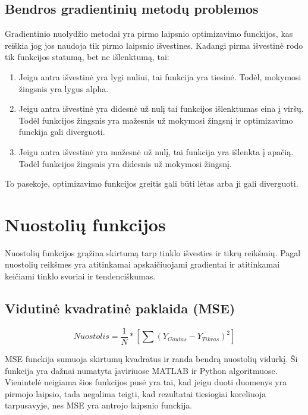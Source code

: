 \documentclass{VUMIFInfKursinis}
\begin{document}
\subsection{Bendros gradientinių metodų problemos}
\par
Gradientinio nuolydžio metodai yra pirmo laipsnio optimizavimo funckijos, kas
reiškia jog jos naudoja tik pirmo laipsnio išvestines. Kadangi pirma išvestinė rodo
tik funkcijos statumą, bet ne išlenktumą, tai:
\begin{enumerate}
\item Jeigu antra išvestinė yra lygi nuliui, tai funkcija yra tiesinė. Todėl,
mokymosi žingsnis yra lygus alpha.
\item Jeigu antra išvestinė yra didesnė už nulį tai funkcijos išlenktumas eina į viršų.
Todėl funkcijos žingsnis yra mažesnis už mokymosi žingsnį ir optimizavimo funckija gali
diverguoti.
\item Jeigu antra išvestinė yra mažesnė už nulį, tai funkcija yra išlenkta į apačią.
Todėl funkcijos žingsnis yra didesnis už mokymosi žingsnį.
\end{enumerate}
\par
To pasekoje, optimizavimo funkcijos greitis gali būti lėtas arba ji gali diverguoti.




\section{Nuostolių funkcijos}
\par
Nuostolių funkcijos grąžina skirtumą tarp tinklo išvesties ir tikrų reikšmių. Pagal
nuostolių reikšmes yra atitinkamai apskaičiuojami gradientai ir atitinkamai
keičiami tinklo svoriai ir tendenciškumas.

\subsection{Vidutinė kvadratinė paklaida (MSE)}
\[
  Nuostolis = \frac{1}{N} * [\sum(Y_{Gautas}-Y_{Tikras})^{2}]
\]
\par
MSE funckija sumuoja skirtumų kvadratus ir randa bendrą nuostolių vidurkį.
Ši funkcija yra dažnai numatyta įaviriuose MATLAB ir Python algoritmuose.
Vienintelė neigiama šios funkcijos pusė yra tai, kad jeigu duoti duomenys yra pirmojo
laipsio, tada negalima teigti, kad rezultatai tiesiogiai koreliuoja tarpusavyje,
nes MSE yra antrojo laipsnio funckija.
\end{document}
